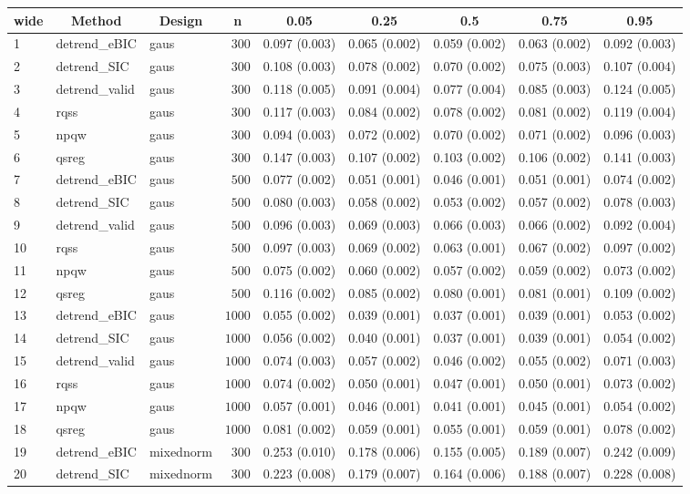 \begin{table}[!tbp]
\begin{center}
\begin{tabular}{lllrlllll}
\hline\hline
\multicolumn{1}{l}{wide}&\multicolumn{1}{c}{Method}&\multicolumn{1}{c}{Design}&\multicolumn{1}{c}{n}&\multicolumn{1}{c}{0.05}&\multicolumn{1}{c}{0.25}&\multicolumn{1}{c}{0.5}&\multicolumn{1}{c}{0.75}&\multicolumn{1}{c}{0.95}\tabularnewline
\hline
1&detrend_eBIC&gaus&$ 300$&0.097 (0.003)&0.065 (0.002)&0.059 (0.002)&0.063 (0.002)&0.092 (0.003)\tabularnewline
2&detrend_SIC&gaus&$ 300$&0.108 (0.003)&0.078 (0.002)&0.070 (0.002)&0.075 (0.003)&0.107 (0.004)\tabularnewline
3&detrend_valid&gaus&$ 300$&0.118 (0.005)&0.091 (0.004)&0.077 (0.004)&0.085 (0.003)&0.124 (0.005)\tabularnewline
4&rqss&gaus&$ 300$&0.117 (0.003)&0.084 (0.002)&0.078 (0.002)&0.081 (0.002)&0.119 (0.004)\tabularnewline
5&npqw&gaus&$ 300$&0.094 (0.003)&0.072 (0.002)&0.070 (0.002)&0.071 (0.002)&0.096 (0.003)\tabularnewline
6&qsreg&gaus&$ 300$&0.147 (0.003)&0.107 (0.002)&0.103 (0.002)&0.106 (0.002)&0.141 (0.003)\tabularnewline
7&detrend_eBIC&gaus&$ 500$&0.077 (0.002)&0.051 (0.001)&0.046 (0.001)&0.051 (0.001)&0.074 (0.002)\tabularnewline
8&detrend_SIC&gaus&$ 500$&0.080 (0.003)&0.058 (0.002)&0.053 (0.002)&0.057 (0.002)&0.078 (0.003)\tabularnewline
9&detrend_valid&gaus&$ 500$&0.096 (0.003)&0.069 (0.003)&0.066 (0.003)&0.066 (0.002)&0.092 (0.004)\tabularnewline
10&rqss&gaus&$ 500$&0.097 (0.003)&0.069 (0.002)&0.063 (0.001)&0.067 (0.002)&0.097 (0.002)\tabularnewline
11&npqw&gaus&$ 500$&0.075 (0.002)&0.060 (0.002)&0.057 (0.002)&0.059 (0.002)&0.073 (0.002)\tabularnewline
12&qsreg&gaus&$ 500$&0.116 (0.002)&0.085 (0.002)&0.080 (0.001)&0.081 (0.001)&0.109 (0.002)\tabularnewline
13&detrend_eBIC&gaus&$1000$&0.055 (0.002)&0.039 (0.001)&0.037 (0.001)&0.039 (0.001)&0.053 (0.002)\tabularnewline
14&detrend_SIC&gaus&$1000$&0.056 (0.002)&0.040 (0.001)&0.037 (0.001)&0.039 (0.001)&0.054 (0.002)\tabularnewline
15&detrend_valid&gaus&$1000$&0.074 (0.003)&0.057 (0.002)&0.046 (0.002)&0.055 (0.002)&0.071 (0.003)\tabularnewline
16&rqss&gaus&$1000$&0.074 (0.002)&0.050 (0.001)&0.047 (0.001)&0.050 (0.001)&0.073 (0.002)\tabularnewline
17&npqw&gaus&$1000$&0.057 (0.001)&0.046 (0.001)&0.041 (0.001)&0.045 (0.001)&0.054 (0.002)\tabularnewline
18&qsreg&gaus&$1000$&0.081 (0.002)&0.059 (0.001)&0.055 (0.001)&0.059 (0.001)&0.078 (0.002)\tabularnewline
19&detrend_eBIC&mixednorm&$ 300$&0.253 (0.010)&0.178 (0.006)&0.155 (0.005)&0.189 (0.007)&0.242 (0.009)\tabularnewline
20&detrend_SIC&mixednorm&$ 300$&0.223 (0.008)&0.179 (0.007)&0.164 (0.006)&0.188 (0.007)&0.228 (0.008)\tabularnewline

\end{tabular}
\end{center}
\end{table}
